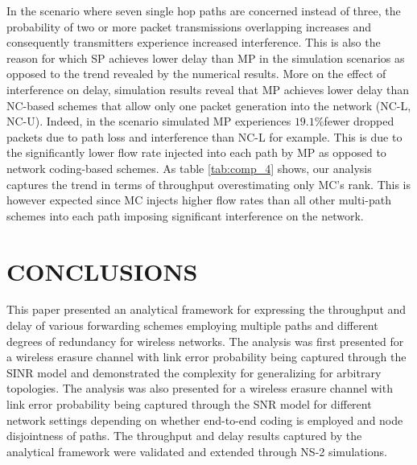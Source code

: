 \documentclass[journal, onecolumn, 12pt]{IEEEtran}
\begin{document}
In the scenario where seven single hop paths are concerned instead of three, the probability of two or more packet transmissions overlapping increases and consequently transmitters experience increased interference.
This is also the reason for which SP achieves lower delay than MP in the simulation scenarios as opposed to the trend revealed by the numerical results.
More on the effect of interference on delay, simulation results reveal that MP achieves lower delay than NC-based schemes that allow only one packet generation into the network (NC-L, NC-U).
Indeed, in the scenario simulated MP experiences $19.1$\%fewer dropped packets due to path loss and interference than NC-L for example.
This is due to the significantly lower flow rate injected into each path by MP as opposed to network coding-based schemes.
As table \ref{tab:comp_4} shows, our analysis captures the trend in terms of throughput overestimating only MC's rank.
This is however expected since MC injects higher flow rates than all other multi-path schemes into each path imposing significant interference on the network.

\section{\uppercase{Conclusions}}
\label{sec:conclusions}

This paper presented an analytical framework for expressing the throughput and delay of various forwarding schemes employing multiple paths and different degrees of redundancy for wireless networks.
The analysis was first presented for a wireless erasure channel with link error probability being captured through the SINR model and demonstrated the complexity for generalizing for arbitrary topologies.
The analysis was also presented for a wireless erasure channel with link error probability being captured through the SNR model for different network settings depending on whether end-to-end coding is employed and node disjointness of paths.
The throughput and delay results captured by the analytical framework were validated and extended through NS-2 simulations.
\end{document}
